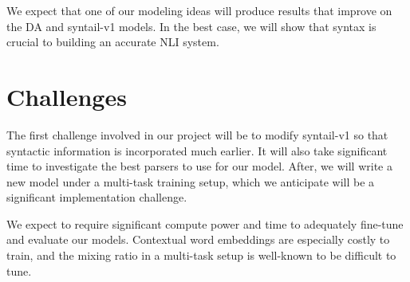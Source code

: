 \documentclass[11pt,a4paper]{article}
\begin{document}
We expect that one of our modeling ideas will produce results that improve on
the DA and syntail-v1 models. In the best case, we will show that syntax is
crucial to building an accurate NLI system.

\section{Challenges}

The first challenge involved in our project will be to modify syntail-v1
so that syntactic information is incorporated much earlier. It will also take
significant time to investigate the best parsers to use for our model.
After, we will write a new model under a multi-task training setup, which we
anticipate will be a significant implementation challenge.

We expect to require significant compute power and time to adequately fine-tune
and evaluate our models. Contextual word embeddings are especially costly to
train, and the mixing ratio in a multi-task setup is well-known to be
difficult to tune.



\end{document}
